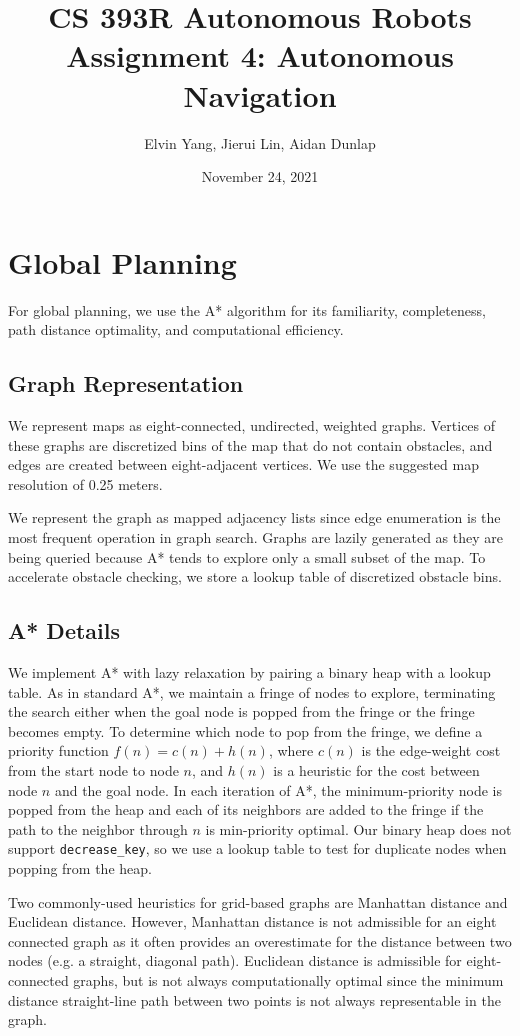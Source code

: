 \documentclass[11pt]{article}
\title{CS 393R Autonomous Robots \\ \large Assignment 4: Autonomous Navigation}
\author{Elvin Yang, Jierui Lin, Aidan Dunlap}
\date{November 24, 2021}
\newcommand{\code}[1]{{\small \tt #1}}
\begin{document}
\maketitle

\section{Global Planning}
For global planning, we use the A* algorithm for its familiarity, completeness,
path distance optimality, and computational efficiency.

\subsection{Graph Representation}
We represent maps as eight-connected, undirected, weighted graphs. Vertices of
these graphs are discretized bins of the map that do not contain obstacles, and
edges are created between eight-adjacent vertices. We use the suggested map
resolution of 0.25 meters.

\bigskip
\noindent
We represent the graph as mapped adjacency lists since edge enumeration is the
most frequent operation in graph search. Graphs are lazily generated as they are
being queried because A* tends to explore only a small subset of the map. To
accelerate obstacle checking, we store a lookup table of discretized obstacle
bins.

\subsection{A* Details}
We implement A* with lazy relaxation by pairing a binary heap with a lookup
table. As in standard A*, we maintain a fringe of nodes to explore, terminating
the search either when the goal node is popped from the fringe or the fringe
becomes empty. To determine which node to pop from the fringe, we define a
priority function $f(n) = c(n) + h(n)$, where $c(n)$ is the edge-weight cost
from the start node to node $n$, and $h(n)$ is a heuristic for the cost between
node $n$ and the goal node. In each iteration of A*, the minimum-priority node
is popped from the heap and each of its neighbors are added to the fringe if the
path to the neighbor through $n$ is min-priority optimal. Our binary heap does
not support \code{decrease\_key}, so we use a lookup table to test for duplicate
nodes when popping from the heap.

\bigskip
\noindent
Two commonly-used heuristics for grid-based graphs are Manhattan distance and
Euclidean distance. However, Manhattan distance is not admissible for an eight
connected graph as it often provides an overestimate for the distance between
two nodes (e.g. a straight, diagonal path). Euclidean distance is admissible for
eight-connected graphs, but is not always computationally optimal since the
minimum distance straight-line path between two points is not always
representable in the graph.
\end{document}
